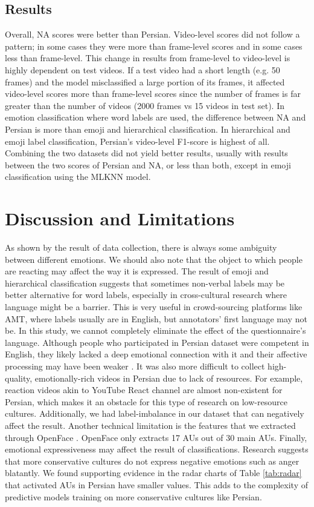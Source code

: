 \documentclass[letterpaper, 10 pt, conference]{ieeeconf}  \usepackage{FG2021}
\begin{document}
\subsection{Results}
Overall, NA scores were better than Persian. Video-level scores did not follow a pattern; in some cases they were more than frame-level scores and in some cases less than frame-level. This change in results from frame-level to video-level is highly dependent on test videos. If a test video had a short length (e.g. 50 frames) and the model misclassified a large portion of its frames, it affected video-level scores more than frame-level scores since the number of frames is far greater than the number of videos (2000 frames vs 15 videos in test set). In emotion classification where word labels are used, the difference between NA and Persian is more than emoji and hierarchical classification. In hierarchical and emoji label classification, Persian's video-level F1-score is highest of all.  
Combining the two datasets did not yield better results, usually with results between the two scores of Persian and NA, or less than both, except in emoji classification using the MLKNN model.


\section{Discussion and Limitations}
As shown by the result of data collection, there is always some ambiguity between different emotions. We should also note that the object to which people are reacting may affect the way it is expressed. The result of emoji and hierarchical classification suggests that sometimes non-verbal labels may be better alternative for word labels, especially in cross-cultural research where language might be a barrier. This is very useful in crowd-sourcing platforms like AMT, where labels usually are in English, but annotators' first language may not be. In this study, we cannot completely eliminate the effect of the questionnaire's language. Although people who participated in Persian dataset were competent in English, they likely lacked a deep emotional connection with it and their affective processing may have been weaker \cite{emotion-language}. It was also more difficult to collect high-quality, emotionally-rich videos in Persian due to lack of resources. For example, reaction videos akin to YouTube React channel are almost non-existent for Persian, which makes it an obstacle for this type of research on low-resource cultures. Additionally, we had label-imbalance in our dataset that can negatively affect the result. 
Another technical limitation is the features that we extracted through OpenFace \cite{openface}. OpenFace only extracts 17 AUs out of 30 main AUs.
Finally, emotional expressiveness may affect the result of classifications. Research suggests that more conservative cultures do not express negative emotions such as anger blatantly. We found supporting evidence in the radar charts of Table \ref{tab:radar} that activated AUs in Persian have smaller values. This adds to the complexity of predictive models training on more conservative cultures like Persian.
\end{document}
